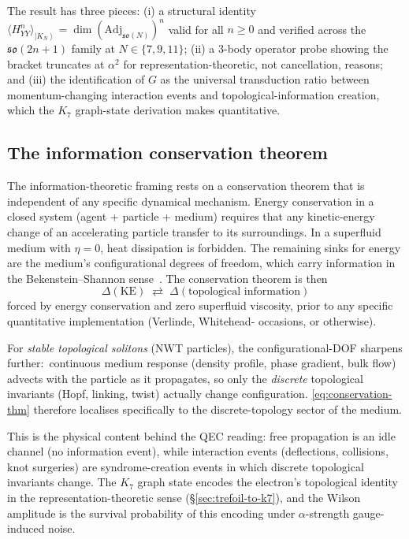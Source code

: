 \documentclass[11pt]{article}
\newcommand{\so}{\mathfrak{so}}
\newcommand{\Adj}{\mathrm{Adj}}
\newcommand{\ket}[1]{\left|#1\right\rangle}
\begin{document}
The result has three pieces: (i) a structural identity
$\langle H_{YY}^n \rangle_{\ket{K_N}} = \dim(\Adj_{\so(N)})^n$ valid for
all $n \geq 0$ and verified across the $\so(2n+1)$ family at
$N \in \{7, 9, 11\}$; (ii) a 3-body operator probe showing the bracket
truncates at $\alpha^2$ for representation-theoretic, not cancellation,
reasons; and (iii) the identification of $G$ as the universal
transduction ratio between momentum-changing interaction events and
topological-information creation, which the $K_7$ graph-state derivation
makes quantitative.

\subsection{The information conservation theorem}
\label{sec:qec-conservation}

The information-theoretic framing rests on a conservation theorem
that is independent of any specific dynamical mechanism.  Energy
conservation in a closed system (agent + particle + medium) requires
that any kinetic-energy change of an accelerating particle transfer
to its surroundings.  In a superfluid medium with $\eta = 0$, heat
dissipation is forbidden.  The remaining sinks for energy are the
medium's configurational degrees of freedom, which carry information
in the Bekenstein--Shannon sense~\cite{bekenstein1973,shannon1948}.
The conservation theorem is then
\begin{equation}
  \boxed{\quad
    \Delta(\text{KE})
    \;\rightleftarrows\;
    \Delta(\text{topological information})
  \quad}
  \label{eq:conservation-thm}
\end{equation}
forced by energy conservation and zero superfluid viscosity, prior
to any specific quantitative implementation (Verlinde, Whitehead-
occasions, or otherwise).

For \emph{stable topological solitons} (NWT particles), the
configurational-DOF sharpens further:\ continuous medium response
(density profile, phase gradient, bulk flow) advects with the
particle as it propagates, so only the \emph{discrete} topological
invariants (Hopf, linking, twist) actually change configuration.
\eqref{eq:conservation-thm} therefore localises specifically to the
discrete-topology sector of the medium.

This is the physical content behind the QEC reading: free propagation
is an idle channel (no information event), while interaction events
(deflections, collisions, knot surgeries) are syndrome-creation events
in which discrete topological invariants change.  The $K_7$ graph
state encodes the electron's topological identity in the
representation-theoretic sense (\S\ref{sec:trefoil-to-k7}), and the
Wilson amplitude is the survival probability of this encoding under
$\alpha$-strength gauge-induced noise.
\end{document}
